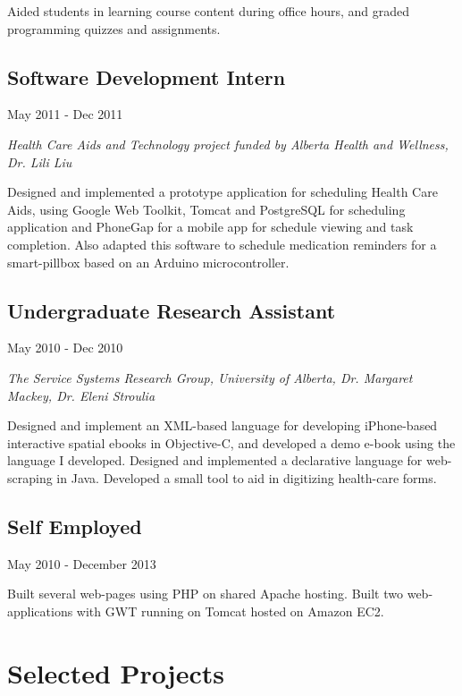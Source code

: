 \documentclass[10pt]{article}
\begin{document}
Aided students in learning course content during office hours, and graded programming quizzes and assignments.

\subsection*{Software Development Intern}
May 2011 - Dec 2011

\emph{Health Care Aids and Technology project funded by Alberta Health and Wellness, Dr. Lili Liu}
\vspace{\baselineskip}

Designed and implemented a prototype application for scheduling Health Care Aids, using Google Web Toolkit, Tomcat and PostgreSQL for scheduling application and PhoneGap for a mobile app for schedule viewing and task completion. Also adapted this software to schedule medication reminders for a smart-pillbox based on an Arduino microcontroller.

\subsection*{Undergraduate Research Assistant}
May 2010 - Dec 2010

\emph{The Service Systems Research Group, University of Alberta, Dr. Margaret Mackey, Dr. Eleni Stroulia}
\vspace{\baselineskip}

Designed and implement an XML-based language for developing iPhone-based interactive spatial ebooks in Objective-C, and developed a demo e-book using the language I developed. Designed and implemented a declarative language for web-scraping in Java. Developed a small tool to aid in digitizing health-care forms.



\subsection*{Self Employed}
May 2010 - December 2013
\vspace{\baselineskip}

Built several web-pages using PHP on shared Apache hosting. Built two web-applications with GWT running on Tomcat hosted on Amazon EC2.

\section*{Selected Projects}
\end{document}
